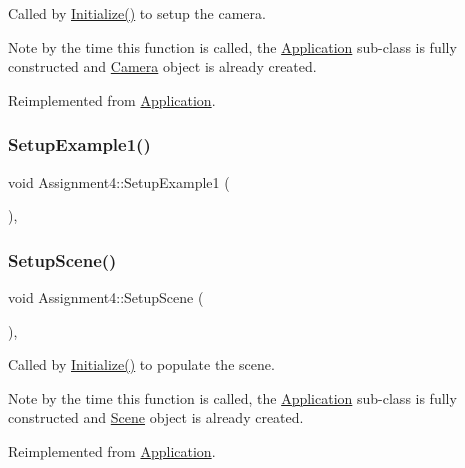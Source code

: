 Called by \hyperlink{class_application_a17cf1ea4552d26a1c20f7d98d793d41d}{Initialize()} to setup the camera. 

Note by the time this function is called, the \hyperlink{class_application}{Application} sub-\/class is fully constructed and \hyperlink{class_camera}{Camera} object is already created. 

Reimplemented from \hyperlink{class_application_a2eb61ca027f223a5c5ad1bf982481193}{Application}.

\hypertarget{class_assignment4_a019c1cc10bd21a91a88e68e11f86b846}{}\label{class_assignment4_a019c1cc10bd21a91a88e68e11f86b846} 
\subsubsection{\texorpdfstring{Setup\+Example1()}{SetupExample1()}}
{\footnotesize\ttfamily void Assignment4\+::\+Setup\+Example1 (\begin{DoxyParamCaption}{ }\end{DoxyParamCaption})\hspace{0.3cm}{\ttfamily [private]}, {\ttfamily [virtual]}}

\hypertarget{class_assignment4_a38c50647bb65ff03aaf293fcc21dc5fd}{}\label{class_assignment4_a38c50647bb65ff03aaf293fcc21dc5fd} 
\subsubsection{\texorpdfstring{Setup\+Scene()}{SetupScene()}}
{\footnotesize\ttfamily void Assignment4\+::\+Setup\+Scene (\begin{DoxyParamCaption}{ }\end{DoxyParamCaption})\hspace{0.3cm}{\ttfamily [private]}, {\ttfamily [virtual]}}



Called by \hyperlink{class_application_a17cf1ea4552d26a1c20f7d98d793d41d}{Initialize()} to populate the scene. 

Note by the time this function is called, the \hyperlink{class_application}{Application} sub-\/class is fully constructed and \hyperlink{class_scene}{Scene} object is already created. 

Reimplemented from \hyperlink{class_application_aa8e8017ef8dd86293c96d0645e66d440}{Application}.

